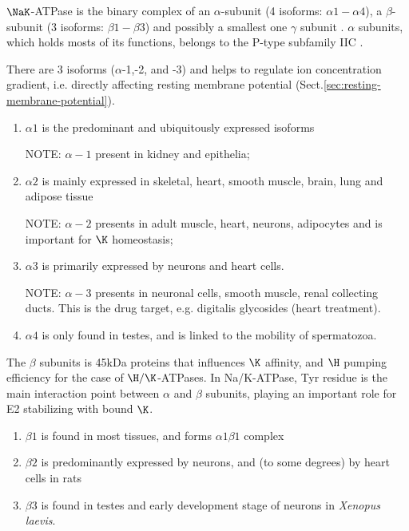 $\NaK$-ATPase is the binary complex of an $\alpha$-subunit (4 isoforms:
$\alpha1-\alpha4$), a $\beta$-subunit (3 isoforms: $\beta1-\beta3$) and possibly
a smallest one $\gamma$ subunit \citep{morth2011}. $\alpha$ subunits, which
holds mosts of its functions, belongs to the P-type subfamily IIC \citep{saez2009}.

There are 3 isoforms ($\alpha$-1,-2, and -3) and helps to regulate ion
concentration gradient, i.e. directly affecting resting membrane potential
(Sect.\ref{sec:resting-membrane-potential}).
\begin{enumerate}
  \item $\alpha1$ is the predominant and ubiquitously expressed isoforms

  NOTE: $\alpha-1$ present in kidney and epithelia;

  \item $\alpha2$ is mainly expressed in skeletal, heart, smooth muscle, brain,
  lung and adipose tissue

  NOTE: $\alpha-2$ presents in adult  muscle, heart, neurons, adipocytes and is
  important for $\K$ homeostasis;  

  \item $\alpha3$ is primarily expressed by neurons and heart cells.
 
  NOTE: $\alpha-3$ presents in neuronal cells, smooth muscle, renal collecting
  ducts. This is the drug target, e.g. digitalis glycosides (heart treatment).

  \item $\alpha4$ is only found in testes, and is linked to the mobility of
  spermatozoa.
\end{enumerate}
  


The $\beta$ subunits is 45kDa proteins that influences $\K$ affinity, and $\H$
pumping efficiency for the case of $\H/\K$-ATPases. In Na/K-ATPase, Tyr
residue is the main interaction point between $\alpha$ and $\beta$ subunits, playing an important
role for E2 stabilizing with bound $\K$. 
\begin{enumerate}
  \item $\beta1$ is found in most tissues, and forms $\alpha1\beta1$ complex
  \item $\beta2$ is predominantly expressed by neurons, and (to some degrees) by
  heart cells in rats
  \item $\beta3$ is found in testes and early development stage of neurons in
  {\it Xenopus laevis}. 
\end{enumerate} 


